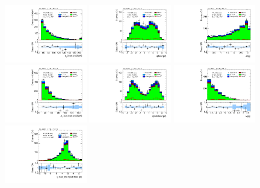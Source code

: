 \clearpage
\begin{figure}[tp]
  \includegraphics[width=0.32\textwidth]{figures/analysis/vbf-WlvCR/jet-1-pt}
  \includegraphics[width=0.32\textwidth]{figures/analysis/vbf-WlvCR/jet-1-eta}
  \includegraphics[width=0.32\textwidth]{figures/analysis/vbf-WlvCR/jets-dphi}
  \includegraphics[width=0.32\textwidth]{figures/analysis/vbf-WlvCR/jet-2-pt}
  \includegraphics[width=0.32\textwidth]{figures/analysis/vbf-WlvCR/jet-2-eta}
  \includegraphics[width=0.32\textwidth]{figures/analysis/vbf-WlvCR/jets-deta}
  \includegraphics[width=0.32\textwidth]{figures/analysis/vbf-WlvCR/jets-etaprod}

\end{figure}
